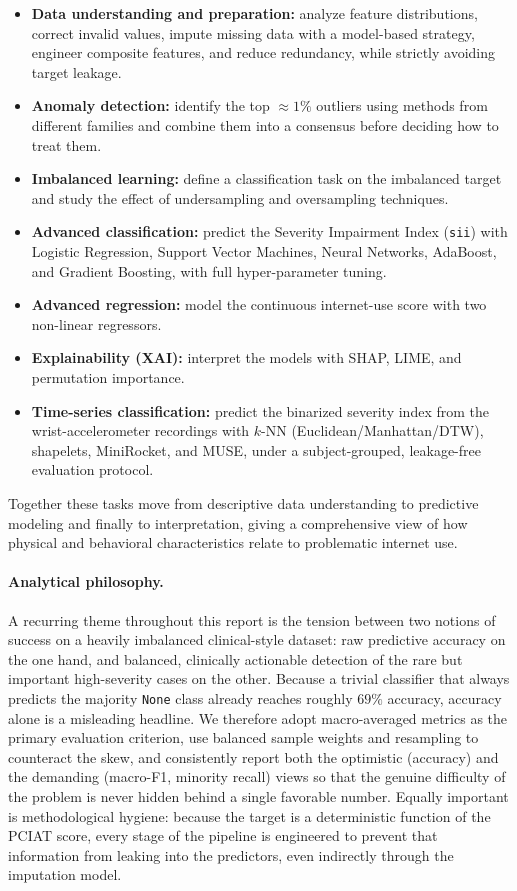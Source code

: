 \begin{itemize}
    \item \textbf{Data understanding and preparation:} analyze feature distributions, correct invalid values, impute missing data with a model-based strategy, engineer composite features, and reduce redundancy, while strictly avoiding target leakage.
    \item \textbf{Anomaly detection:} identify the top $\approx 1\%$ outliers using methods from different families and combine them into a consensus before deciding how to treat them.
    \item \textbf{Imbalanced learning:} define a classification task on the imbalanced target and study the effect of undersampling and oversampling techniques.
    \item \textbf{Advanced classification:} predict the Severity Impairment Index (\texttt{sii}) with Logistic Regression, Support Vector Machines, Neural Networks, AdaBoost, and Gradient Boosting, with full hyper-parameter tuning.
    \item \textbf{Advanced regression:} model the continuous internet-use score with two non-linear regressors.
    \item \textbf{Explainability (XAI):} interpret the models with SHAP, LIME, and permutation importance.
    \item \textbf{Time-series classification:} predict the binarized severity index from the wrist-accelerometer recordings with $k$-NN (Euclidean/Manhattan/DTW), shapelets, MiniRocket, and MUSE, under a subject-grouped, leakage-free evaluation protocol.
\end{itemize}

Together these tasks move from descriptive data understanding to predictive modeling and finally to interpretation, giving a comprehensive view of how physical and behavioral characteristics relate to problematic internet use.\\

\paragraph{Analytical philosophy.} A recurring theme throughout this report is the tension between two notions of success on a heavily imbalanced clinical-style dataset: raw predictive accuracy on the one hand, and balanced, clinically actionable detection of the rare but important high-severity cases on the other. Because a trivial classifier that always predicts the majority \texttt{None} class already reaches roughly $69\%$ accuracy, accuracy alone is a misleading headline. We therefore adopt macro-averaged metrics as the primary evaluation criterion, use balanced sample weights and resampling to counteract the skew, and consistently report both the optimistic (accuracy) and the demanding (macro-F1, minority recall) views so that the genuine difficulty of the problem is never hidden behind a single favorable number. Equally important is methodological hygiene: because the target is a deterministic function of the PCIAT score, every stage of the pipeline is engineered to prevent that information from leaking into the predictors, even indirectly through the imputation model.

